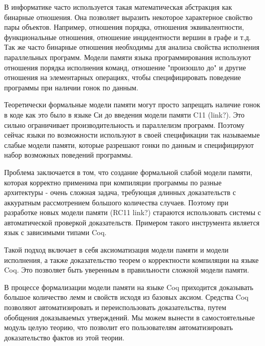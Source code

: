 \documentclass[times,specification,annotation]{itmo-student-thesis}
\begin{document}

\tableofcontents

\startprefacepage


 В информатике часто используется такая математическая абстракция как бинарные отношения.
Она позволяет выразить некоторое характерное свойство пары объектов. Например, отношения порядка, отношения эквивалентности, функциональные отношения, отношение инцидентности вершин в графе и т.д.
Так же часто бинарные отношения необходимы для анализа свойства исполнения параллельных программ. Модели памяти языка программирования используют отношения порядка исполнения команд, отношение "произошло до" и другие отношения на элементарных операциях, чтобы специфицировать поведение программы при наличии гонок по данным.

Теоретически формальные модели памяти могут просто запрещать наличие гонок в коде как это было в языке Си до введения модели памяти C11 (link?). Это сильно ограничивает производительность и параллелизм программ. Поэтому сейчас языки по возможности используют в своей спецификации так называемые слабые модели памяти, которые разрешают гонки по данным и специфицируют набор возможных поведений программы.

Проблема заключается в том, что создание формальной слабой модели памяти, которая корректно применима при компиляции программы по разные архитектуры - очень сложная задача, требующая длинных доказательств с аккуратным рассмотрением большого количества случаев.
Поэтому при разработке новых модели памяти (RC11 link?) стараются использовать системы с автоматической проверкой доказательств. Примером такого инструмента является язык с зависимыми типами Coq.

Такой подход включает в себя аксиоматизация модели памяти и модели исполнения, а
также доказательство теорем о корректности компиляции на языке Coq. Это позволяет быть уверенным в правильности сложной модели памяти.

В процессе формализации модели памяти на языке Coq приходится доказывать большое количество лемм и свойств исходя из базовых аксиом. Средства Coq позволяют автоматизировать и переиспользовать доказательства, путем обобщения доказываемых утверждений. Мы можем вынести в самостоятельные модуль целую теорию, что позволит его пользователям автоматизировать доказательство фактов из этой теории.
\end{document}
